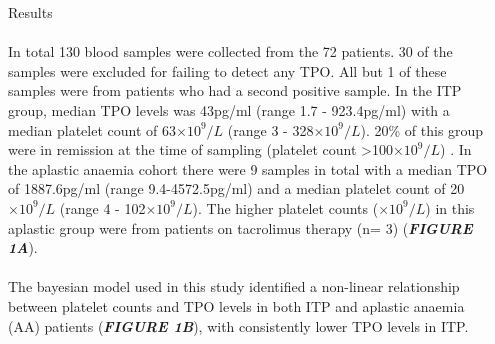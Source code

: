\documentclass[landscape,a0paper,fontscale=0.285]{beamer} %
\newlength{\onecolwid}
\newlength{\twocolwid}
\begin{document}
\begin{frame}[t]
\begin{columns}[t]
\begin{column}{\twocolwid}
\begin{columns}[t,totalwidth=\twocolwid]
\begin{column}{\onecolwid}
\begin{block}{Results}
\paragraph{} In total 130 blood samples were collected from the 72 patients. 30 of the samples were excluded for failing to detect any TPO. All but 1 of these samples were from patients who had a second positive sample. In the ITP group, median TPO levels was 43pg/ml (range 1.7 - 923.4pg/ml) with a median platelet count of 63$\times 10^9/L$ (range 3 - 328$\times 10^9/L$). 20\% of this group were in remission at the time of sampling (platelet count >100$\times 10^9/L$) . In the aplastic anaemia cohort there were 9 samples in total with a median TPO of 1887.6pg/ml (range 9.4-4572.5pg/ml) and a median platelet count of 20$\times 10^9/L$ (range 4 - 102$\times 10^9/L$). The higher platelet counts ($\times 10^9/L$) in this aplastic group were from patients on tacrolimus therapy (n= 3) (\textit{\textbf{FIGURE 1A}}). 

\vspace{30pt}

\paragraph{} The bayesian model used in this study identified a non-linear relationship between platelet counts and TPO levels in both ITP and aplastic anaemia (AA) patients (\textbf{\emph{FIGURE 1B}}), with consistently lower TPO levels in ITP. 

\end{block}



\end{column} %

\begin{column}{\onecolwid} %


\end{column}
\end{columns}
\end{column}
\end{columns}
\end{frame}
\end{document}
